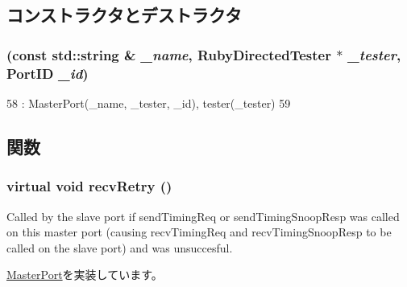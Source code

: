 \subsection{コンストラクタとデストラクタ}
\hypertarget{classRubyDirectedTester_1_1CpuPort_aefe451fe0d0fe79402ee473f29c82517}{
\subsubsection[{CpuPort}]{ (const std::string \& {\em \_\-name}, \/  {\bf RubyDirectedTester} $\ast$ {\em \_\-tester}, \/  {\bf PortID} {\em \_\-id})}}
\label{classRubyDirectedTester_1_1CpuPort_aefe451fe0d0fe79402ee473f29c82517}



\begin{DoxyCode}
58             : MasterPort(_name, _tester, _id), tester(_tester)
59         {}
\end{DoxyCode}


\subsection{関数}
\hypertarget{classRubyDirectedTester_1_1CpuPort_a7ec461ad187b82b4b21e27c86e45cf9c}{
\subsubsection[{recvRetry}]{\setlength{\rightskip}{0pt plus 5cm}virtual void recvRetry ()}}
\label{classRubyDirectedTester_1_1CpuPort_a7ec461ad187b82b4b21e27c86e45cf9c}
Called by the slave port if sendTimingReq or sendTimingSnoopResp was called on this master port (causing recvTimingReq and recvTimingSnoopResp to be called on the slave port) and was unsuccesful. 

\hyperlink{classMasterPort_ac1ccc3bcf7ebabb20b57fab99b2be5b0}{MasterPort}を実装しています。


